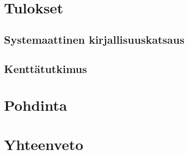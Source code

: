 \section{Tulokset}
\subsection{Systemaattinen kirjallisuuskatsaus}
\subsection{Kenttätutkimus}


\section{Pohdinta}

\section{Yhteenveto}
